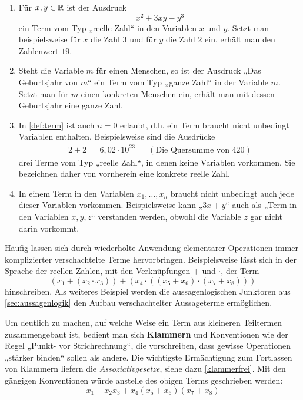 \begin{bsp} \label{bsp:term} \quad
    \begin{enumerate}
        \item Für $x,y\in \mathbb R$ ist der Ausdruck
            \[ x^2+3xy-y^3 \]
        ein Term vom Typ „reelle Zahl“ in den Variablen $x$ und $y$. Setzt man beispielsweise für $x$ die Zahl $3$ und für $y$ die Zahl $2$ ein, erhält man den Zahlenwert $19$.
        \item Steht die Variable $m$ für einen Menschen, so ist der Ausdruck „Das Geburtsjahr von $m$“ ein Term vom Typ „ganze Zahl“ in der Variable $m$. Setzt man für $m$ einen konkreten Menschen ein, erhält man mit dessen Geburtsjahr eine ganze Zahl.
        \item In \cref{def:term} ist auch $n=0$ erlaubt, d.h. ein Term braucht nicht unbedingt Variablen enthalten. Beispielsweise sind die Ausdrücke
        \begin{align*}
             2+2 && 6{,}02\cdot 10^{23} && (\text{Die Quersumme von $420$})
        \end{align*}
        drei Terme vom Typ „reelle Zahl“, in denen keine Variablen vorkommen. Sie bezeichnen daher von vornherein eine konkrete reelle Zahl.
        \item In einem Term in den Variablen $x_1,\dots , x_n$ braucht nicht unbedingt auch jede dieser Variablen vorkommen. Beispielsweise kann „$3x+y$“ auch als „Term in den Variablen $x,y,z$“ verstanden werden, obwohl die Variable $z$ gar nicht darin vorkommt.
    \end{enumerate}
\end{bsp}


\begin{nota}[Klammersetzung] \label{klammern}
    Häufig lassen sich durch wiederholte Anwendung elementarer Operationen immer komplizierter verschachtelte Terme hervorbringen. Beispielsweise lässt sich in der Sprache der reellen Zahlen, mit den Verknüpfungen $+$ und $\cdot$, der Term
        \[ (x_1 +(x_2\cdot x_3))+(x_4\cdot ((x_5+x_6)\cdot (x_7+x_8)))\]
    hinschreiben. Als weiteres Beispiel werden die aussagenlogischen Junktoren aus \cref{sec:aussagenlogik} den Aufbau verschachtelter Aussageterme ermöglichen.

    Um deutlich zu machen, auf welche Weise ein Term aus kleineren Teiltermen zusammengebaut ist, bedient man sich \textbf{Klammern} und Konventionen wie der Regel „Punkt- vor Strichrechnung“, die vorschreiben, dass gewisse Operationen „stärker binden“ sollen als andere. Die wichtigste Ermächtigung zum Fortlassen von Klammern liefern die \emph{Assoziativgesetze}, siehe dazu \cref{klammerfrei}. Mit den gängigen Konventionen würde anstelle des obigen Terms geschrieben werden:
        \[ x_1 + x_2x_3+x_4(x_5+x_6)(x_7+x_8)\]
\end{nota}



